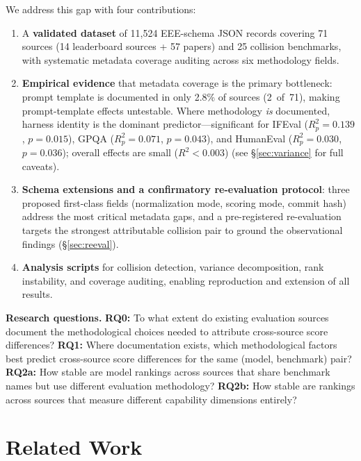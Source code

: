 \documentclass[11pt]{article}
\begin{document}
We address this gap with four contributions:
\begin{enumerate}
\item A \textbf{validated dataset} of 11,524 EEE-schema JSON records
  covering 71 sources (14 leaderboard sources + 57 papers) and 25 collision
  benchmarks, with systematic metadata coverage auditing across six methodology fields.
\item \textbf{Empirical evidence} that metadata coverage is the primary
  bottleneck: prompt template is documented in only 2.8\% of sources (2~of~71),
  making prompt-template effects untestable.
  Where methodology \emph{is} documented, harness identity is the dominant
  predictor---significant for IFEval ($R^2_p = 0.139$, $p = 0.015$),
  GPQA ($R^2_p = 0.071$, $p = 0.043$), and HumanEval ($R^2_p = 0.030$,
  $p = 0.036$); overall effects are small ($R^2 < 0.003$)
  (see \S\ref{sec:variance} for full caveats).
\item \textbf{Schema extensions and a confirmatory re-evaluation
  protocol}: three proposed first-class fields (normalization mode,
  scoring mode, commit hash) address the most critical metadata gaps,
  and a pre-registered re-evaluation targets the strongest
  attributable collision pair to ground the observational findings
  (\S\ref{sec:reeval}).
\item \textbf{Analysis scripts} for collision detection, variance
  decomposition, rank instability, and coverage auditing, enabling
  reproduction and extension of all results.
\end{enumerate}

\textbf{Research questions.}
\textbf{RQ0:} To what extent do existing evaluation sources document
the methodological choices needed to attribute cross-source score differences?
\textbf{RQ1:} Where documentation exists, which methodological factors
best predict cross-source score differences for the same (model, benchmark) pair?
\textbf{RQ2a:} How stable are model rankings across sources that share
benchmark names but use different evaluation methodology?
\textbf{RQ2b:} How stable are rankings across sources that measure
different capability dimensions entirely?

\section{Related Work}
\end{document}
